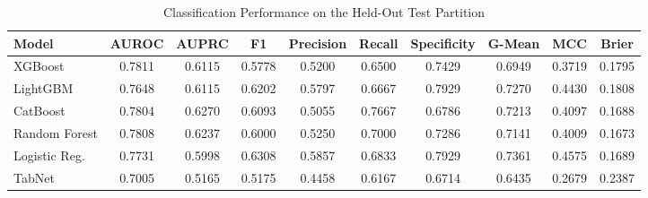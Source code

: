\begin{table}
\centering
\caption{Classification Performance on the Held-Out Test Partition}
\label{tab:results}
\begin{tabular}{lccccccccc}
\toprule
Model & AUROC & AUPRC & F1 & Precision & Recall & Specificity & G-Mean & MCC & Brier \\
\midrule
XGBoost & 0.7811 & 0.6115 & 0.5778 & 0.5200 & 0.6500 & 0.7429 & 0.6949 & 0.3719 & 0.1795 \\
LightGBM & 0.7648 & 0.6115 & 0.6202 & 0.5797 & 0.6667 & 0.7929 & 0.7270 & 0.4430 & 0.1808 \\
CatBoost & 0.7804 & 0.6270 & 0.6093 & 0.5055 & 0.7667 & 0.6786 & 0.7213 & 0.4097 & 0.1688 \\
Random Forest & 0.7808 & 0.6237 & 0.6000 & 0.5250 & 0.7000 & 0.7286 & 0.7141 & 0.4009 & 0.1673 \\
Logistic Reg. & 0.7731 & 0.5998 & 0.6308 & 0.5857 & 0.6833 & 0.7929 & 0.7361 & 0.4575 & 0.1689 \\
TabNet & 0.7005 & 0.5165 & 0.5175 & 0.4458 & 0.6167 & 0.6714 & 0.6435 & 0.2679 & 0.2387 \\
\bottomrule
\end{tabular}
\end{table}
